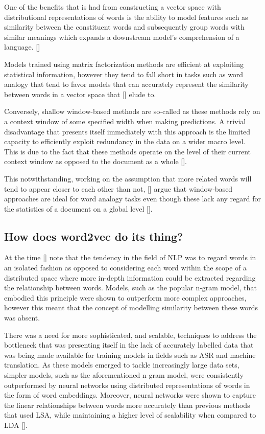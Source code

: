 \documentclass[12pt, a4paper]{report}
\theoremstyle{definition}
\theoremstyle{definition}%
\theoremstyle{definition}%
\theoremstyle{definition}%
\theoremstyle{definition}%
\theoremstyle{definition}%
\renewcommand{\cite}[1]{[\citealp{#1}]}
\begin{document}
One of the benefits that is had from constructing a vector space with distributional representations of words is the ability to model features such as similarity between the constituent words and subsequently group words with similar meanings which expands a downstream model's comprehension of a language. \cite{mikolov2013b}

Models trained using matrix factorization methods are efficient at exploiting statistical information, however they tend to fall short in tasks such as word analogy that tend to favor models that can accurately represent the similarity between words in a vector space that \cite{mikolov2013} elude to. 


Conversely, shallow window-based methods are so-called as these methods rely on a context window of some specified width when making predictions. A trivial disadvantage that presents itself immediately with this approach is the limited capacity to efficiently exploit redundancy in the data on a wider macro level. This is due to the fact that these methods operate on the level of their current context window as opposed to the document as a whole \cite{pennington}.

This notwithstanding, working on the assumption that more related words will tend to appear closer to each other than not, \cite{mikolov2013} argue that window-based approaches are ideal for word analogy tasks even though these lack any regard for the statistics of a document on a global level \cite{pennington}.

\subsection{How does word2vec do its thing?}
At the time \cite{mikolov2013} note that the tendency in the field of NLP was to regard words in an isolated fashion as opposed to considering each word within the scope of a distributed space where more in-depth information could be extracted regarding the relationship between words. Models, such as the popular n-gram model, that embodied this principle were shown to outperform more complex approaches, however this meant that the concept of modelling similarity between these words was absent. 

There was a need for more sophisticated, and scalable, techniques to address the bottleneck that was presenting itself in the lack of accurately labelled data that was being made available for training models in fields such as ASR and machine translation. As these models emerged to tackle increasingly large data sets, simpler models, such as the aforementioned n-gram model, were consistently outperformed by neural networks using distributed representations of words in the form of word embeddings. Moreover, neural networks were shown to capture the linear relationships between words more accurately than previous methods that used LSA, while maintaining a higher level of scalability when compared to LDA \cite{mikolov2013}. 
\end{document}
